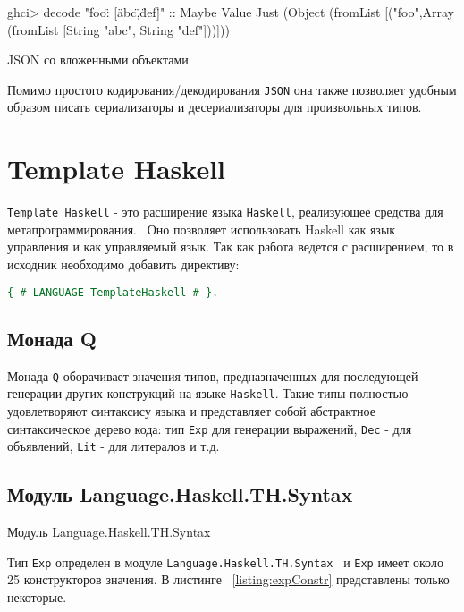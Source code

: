 \begin{ListingEnv}[H]
\begin{Verb}
ghci> decode "{\"foo\": [\"abc\",\"def\"]}" :: Maybe Value
Just (Object (fromList [("foo",Array (fromList [String "abc", 
                                               String "def"]))]))
\end{Verb}
\caption{JSON со вложенными объектами}
\label{listing:astGetComp}
\end{ListingEnv}

Помимо простого кодирования/декодирования \lstinline{JSON} она также позволяет удобным образом писать сериализаторы и десериализаторы для произвольных типов.

\section{Template Haskell}

\lstinline{Template Haskell} - это расширение языка \lstinline{Haskell}, реализующее средства для метапрограммирования.~\cite{extensionHub} Оно позволяет использовать Haskell как язык управления и как управляемый язык. Так как работа ведется с расширением, то в исходник необходимо добавить директиву:

\begin{lstlisting}[language=Haskell]
{-# LANGUAGE TemplateHaskell #-}.
\end{lstlisting}

\subsection{Монада Q}

Монада \lstinline{Q} оборачивает значения типов, предназначенных для последующей генерации других конструкций на языке \lstinline{Haskell}. Такие типы полностью удовлетворяют синтаксису языка и представляет собой абстрактное синтаксическое дерево кода: тип \lstinline{Exp} для генерации выражений, \lstinline{Dec} - для объявлений, \lstinline{Lit} - для литералов и т.д.~\cite{thSyntax}

\subsection{Модуль Language.Haskell.TH.Syntax}

Модуль Language.Haskell.TH.Syntax

Тип \lstinline{Exp} определен в модуле \lstinline{Language.Haskell.TH.Syntax}~\cite{coverHaskell} и  \lstinline{Exp} имеет около 25 конструкторов значения. В листинге ~\ref{listing:expConstr} представлены только некоторые.  

